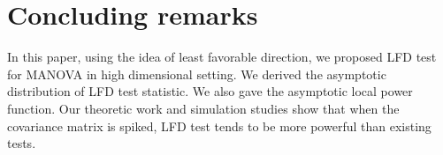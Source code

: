 \documentclass[12pt]{article} %
\theoremstyle{definition}
\begin{document}

\section{Concluding remarks}\label{concluding}
In this paper, using the idea of least favorable direction, we proposed LFD test for MANOVA in high dimensional setting.
We derived the asymptotic distribution of LFD test statistic. We also gave the asymptotic local power function.
Our theoretic work and simulation studies show that when the covariance matrix is spiked, LFD test tends to be more powerful than existing tests.
\end{document}

